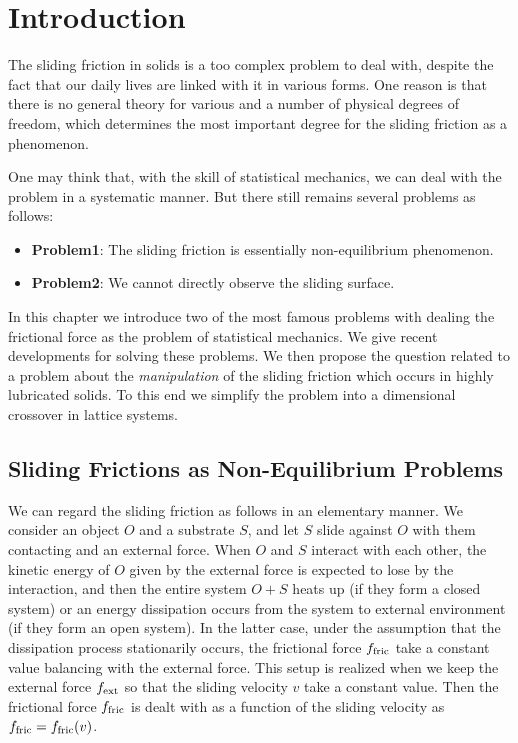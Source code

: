 \chapter{Introduction}
The sliding friction in solids is a too complex problem to deal with, despite the fact that our daily lives are linked with it in various forms. One reason is that there is no general theory for various and a number of physical degrees of freedom, which determines the most important degree for the sliding friction as a phenomenon.

One may think that, with the skill of statistical mechanics, we can deal with the problem in a systematic manner. But there still remains several problems as follows:
\begin{itemize}
	\item \textbf{Problem1}: The sliding friction is essentially non-equilibrium phenomenon.
	\item \textbf{Problem2}: We cannot directly observe the sliding surface.
\end{itemize}

In this chapter we introduce two of the most famous problems with dealing the frictional force as the problem of statistical mechanics. We give recent developments for solving these problems. We then propose the question related to a problem about the \textit{manipulation} of the sliding friction which occurs in highly lubricated solids. To this end we simplify the problem into a dimensional crossover in lattice systems.

\section{Sliding Frictions as Non-Equilibrium Problems}
We can regard the sliding friction as follows in an elementary manner. We consider an object $O$ and a substrate $S$, and let $S$ slide against $O$ with them contacting and an external force. When $O$ and $S$ interact with each other, the kinetic energy of $O$ given by the external force is expected to lose by the interaction, and then the entire system $O+S$ heats up (if they form a closed system) or an energy dissipation occurs from the system to external environment (if they form an open system). In the latter case, under the assumption that the dissipation process stationarily occurs, the frictional force $f_{\rm fric}$ take a constant value balancing with the external force. This setup is realized when we keep the external force $f_{\rm ext}$ so that the sliding velocity $v$ take a constant value. Then the frictional force $f_{\rm fric}$ is dealt with as a function of the sliding velocity as $f_{\rm fric}=f_{\rm fric}(v)$.

